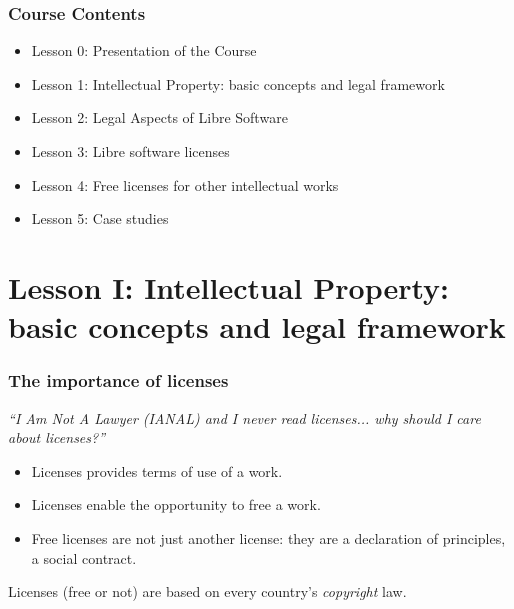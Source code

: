 

\begin{frame}
  \frametitle{Course Contents}

  \begin{itemize}
    \item Lesson 0: Presentation of the Course
    \item \alert{Lesson 1: Intellectual Property: basic concepts and legal framework}
    \item Lesson 2: Legal Aspects of Libre Software
    \item Lesson 3: Libre software licenses
    \item Lesson 4: Free licenses for other intellectual works
    \item Lesson 5: Case studies
  \end{itemize}

\end{frame}


\section{Lesson I: Intellectual Property: basic concepts and legal framework}








\begin{frame}
\frametitle{The importance of licenses}
\textit{``\alert{I} \alert{A}m \alert{N}ot \alert{A} \alert{L}awyer (IANAL) and I never read licenses... why should I care about licenses?''}

\pause

\begin{itemize}[<+->]
\item Licenses provides terms of use of a work.
\item Licenses enable the opportunity to free a work.
\item Free licenses are not just another license: they are a declaration of principles, a social contract.
\end{itemize}
\bigskip

\pause

\alert{Licenses (free or not) are based on every country's \textit{copyright} law.}

\end{frame}


